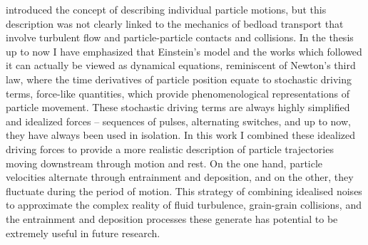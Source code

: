 \citet{Einstein1937} introduced the concept of describing individual particle motions, but this description was not clearly linked to the mechanics of bedload transport that involve turbulent flow and particle-particle contacts and collisions.
In the thesis up to now I have emphasized that Einstein's model and the works which followed it can actually be viewed as dynamical equations, reminiscent of Newton's third law, where the time derivatives of particle position equate to stochastic driving terms, force-like quantities, which provide phenomenological representations of particle movement.
These stochastic driving terms are always highly simplified and idealized forces -- sequences of pulses, alternating switches, and up to now, they have always been used in isolation. 
In this work I combined these idealized driving forces to provide a more realistic description of particle trajectories moving downstream through motion and rest.
On the one hand, particle velocities alternate through entrainment and deposition, and on the other, they fluctuate during the period of motion.
This strategy of combining idealised noises to approximate the complex reality of fluid turbulence, grain-grain collisions, and the entrainment and deposition processes these generate has potential to be extremely useful in future research.



